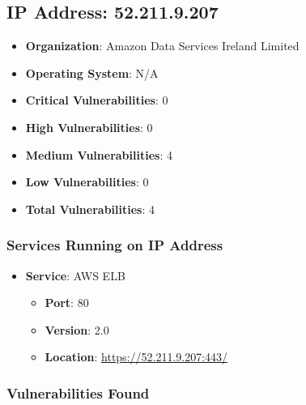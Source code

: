 \documentclass{article}
\begin{document}
\clearpage



\subsection{IP Address: 52.211.9.207}

\begin{itemize}
    \item \textbf{Organization}: Amazon Data Services Ireland Limited
    \item \textbf{Operating System}:  N/A 
    \item \textbf{Critical Vulnerabilities}: 0
    \item \textbf{High Vulnerabilities}: 0
    \item \textbf{Medium Vulnerabilities}: 4
    \item \textbf{Low Vulnerabilities}: 0
    \item \textbf{Total Vulnerabilities}: 4
\end{itemize}

\subsubsection*{Services Running on IP Address}

\begin{itemize}
    
        \item \textbf{Service}: AWS ELB
        \begin{itemize}
            \item \textbf{Port}: 80
            \item \textbf{Version}:  2.0 
            \item \textbf{Location}: \href{ https://52.211.9.207:443/ }{ https://52.211.9.207:443/ }
        \end{itemize}
    
\end{itemize}


\subsubsection*{Vulnerabilities Found}
\end{document}
